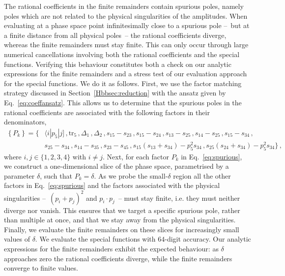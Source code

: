 \documentclass[main.tex]{subfiles}
\begin{document}
The rational coefficients in the finite remainders contain spurious poles, namely poles which are not related to the physical singularities of the amplitudes. When evaluating at a phase space point infinitesimally close to a spurious pole --~but at a finite distance from all physical poles~-- the rational coefficients diverge, whereas the finite remainders must stay finite. This can only occur through large numerical cancellations involving both the rational coefficients and the special functions. Verifying this behaviour constitutes both a check on our analytic expressions for the finite remainders and a stress test of our evaluation approach for the special functions. We do it as follows.
First, we use the factor matching strategy discussed in Section~\ref{Hbbsec:reduction} with the ansatz given by Eq.~\eqref{eq:coeffansatz}. This allows us to determine that the spurious poles in the rational coefficients are associated with the following factors in their denominators,
\begin{equation} \label{eq:spurious}
\begin{aligned}
\left\{P_k \right\} = \biggl\{ & \langle i | p_{5}| j] \,, \text{tr}_5 \,, \Delta_1 \,, \Delta_2 \,, s_{15} - s_{23} \,, s_{15} - s_{24} \,, s_{13} - s_{25} \,, s_{14} - s_{25} \,, s_{15} - s_{34} \,,  \\
  &  s_{25} - s_{34} \,, s_{14} - s_{35} \,, s_{23} - s_{45} \,,
 s_{15} (s_{13}+s_{34}) - p_5^2  s_{34}  \,,
 s_{25} (s_{24}+s_{34}) - p_5^2  s_{34} \biggr\} \,,
\end{aligned}
\end{equation}
where $i,j \in \{1,2,3,4\}$ with $i\neq j$. Next, for each factor $P_k$ in Eq.~\eqref{eq:spurious}, we construct a one-dimensional slice of the phase space, parametrised by a parameter $\delta$, such that $P_k = \delta$. As we probe the small-$\delta$ region all the other factors in Eq.~\eqref{eq:spurious} and the factors associated with the physical singularities --~$(p_i+p_j)^2$ and $p_i \cdot p_j$~-- must stay finite, i.e. they must neither diverge nor vanish. This ensures that we target a specific spurious pole, rather than multiple at once, and that we stay away from the physical singularities. Finally, we evaluate the finite remainders on these slices for increasingly small values of $\delta$. We evaluate the special functions with $64$-digit accuracy. Our analytic expressions for the finite remainders exhibit the expected behaviour: as $\delta$ approaches zero the rational coefficients diverge, while the finite remainders converge to finite values. 
\end{document}
